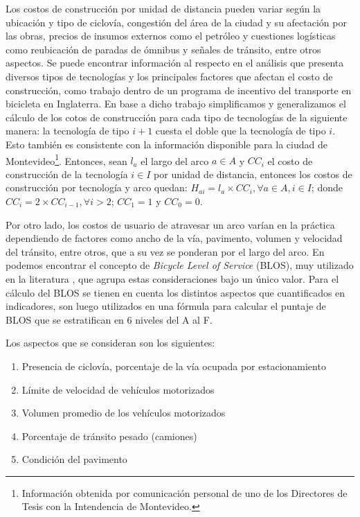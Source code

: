 Los costos de construcción por unidad de distancia pueden variar según la ubicación y tipo de ciclovía, congestión del área de la ciudad y su afectación por las obras, precios de insumos externos como el petróleo y cuestiones logísticas como reubicación de paradas de ómnibus y señales de tránsito, entre otros aspectos. Se puede encontrar información al respecto en el análisis \textcite{typicalcostsofcylcing} que presenta diversos tipos de tecnologías y los principales factores que afectan el costo de construcción, como trabajo dentro de un programa de incentivo del transporte en bicicleta en Inglaterra. En base a dicho trabajo simplificamos y generalizamos el cálculo de los cotos de construcción para cada tipo de tecnologías de la siguiente manera: la tecnología de tipo $i + 1$ cuesta el doble que la tecnología de tipo $i$. Esto también es consistente con la información disponible para la ciudad de Montevideo\footnote{Información obtenida por comunicación personal de uno de los Directores de Tesis con la Intendencia de Montevideo.}. Entonces, sean $l_a$ el largo del arco $a \in A$ y $CC_i$ el costo de construcción de la tecnología $i \in I$ por unidad de distancia, entonces los costos de construcción por tecnología y arco quedan: $H_{ai} = l_a \times CC_i, \forall a \in A, i \in I$; donde $CC_i = 2 \times CC_{i-1}, \forall i > 2$; $CC_1 = 1$ y $CC_0 = 0$.

Por otro lado, los costos de usuario de atravesar un arco varían en la práctica dependiendo de factores como ancho de la vía, pavimento, volumen y velocidad del tránsito, entre otros, que a su vez se ponderan por el largo del arco. En \textcite{blos2007} podemos encontrar el concepto de {\it Bicycle Level of Service} (BLOS), muy utilizado en la literatura \parencite{Zhu2019, Liu2019}, que agrupa estas consideraciones bajo un único valor. Para el cálculo del BLOS se tienen en cuenta los distintos aspectos que cuantificados en indicadores, son luego utilizados en una fórmula para calcular el puntaje de BLOS que se estratifican en 6 niveles del A al F.

Los aspectos que se consideran son los siguientes:

\begin{enumerate}
  \item{Presencia de ciclovía, porcentaje de la vía ocupada por estacionamiento}
  \item{Límite de velocidad de vehículos motorizados}
  \item{Volumen promedio de los vehículos motorizados}
  \item{Porcentaje de tránsito pesado (camiones)}
  \item{Condición del pavimento}
\end{enumerate}

